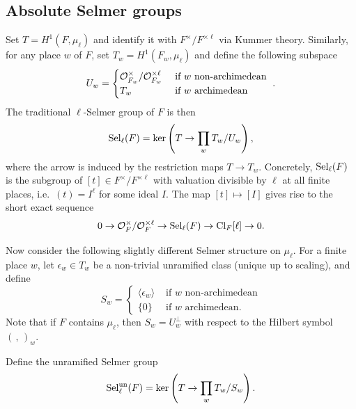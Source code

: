 \documentclass[11pt,a4paper]{amsart}
\def\O{{\rm \mathcal{O}}}
\def\un{{\rm un}}
\def\Cl{{\rm Cl}}
\def\Sel{{\rm Sel}}
\numberwithin{equation}{section}
\begin{document}
\subsection{Absolute Selmer groups}
Set $T = H^1(F, \mu_\ell)$ and identify it with $F^\times/F^{\times \ell}$ via Kummer theory. Similarly, for any place $w$ of $F$, set $T_w = H^1(F_w, \mu_\ell)$ and define the following subspace
\[U_w = \begin{cases}    
\O_{F_w}^\times/\O_{F_w}^{\times \ell} & \mbox{ if $w$ non-archimedean }\\ 
 T_w  & \mbox{ if $w$ archimedean}
\end{cases}.\] 
The traditional $\ell$-Selmer group of $F$ is then
\[\Sel_\ell(F) = \ker\left(T \to \prod_w T_w/U_w\right),\]
where the arrow is induced by the restriction maps $T \to T_w$. 
 Concretely, $\Sel_\ell(F)$ is the subgroup of $[t] \in F^\times/F^{\times \ell}$ with valuation divisible by $\ell$ at all finite places, i.e.\ $(t) = I^\ell$ for some ideal $I$.  The map $[t] \mapsto [I]$ gives rise to the short exact sequence
\begin{equation}\label{seq: selmer group ses}
    0 \to \O^\times_F/\O_F^{\times \ell} \to \Sel_\ell(F) \to \Cl_F[\ell] \to 0.
    \end{equation}

Now consider the following slightly different Selmer structure on $\mu_\ell$. For a finite place $w$, let $\epsilon_w \in T_w$ be a non-trivial unramified class (unique up to scaling), and define 
\[S_w = \begin{cases}
    \langle \epsilon_w\rangle & \mbox { if $w$ non-archimedean} \\
    \{0\} & \mbox{ if $w$ archimedean}.
\end{cases}\]
Note that if $F$ contains $\mu_\ell$, then  $S_w = U_w^\perp$ with respect to the Hilbert symbol $(\, ,\, )_w$. 

Define the unramified Selmer group
\[\Sel_\ell^\un(F) = \ker\left(T \to \prod_wT_w/S_w \right).\]
\end{document}
